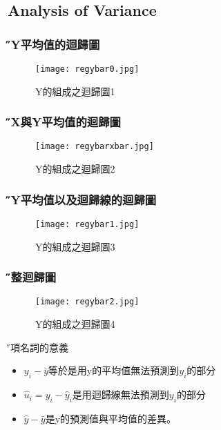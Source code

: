\documentclass[xcolor=dvipsnames]{beamer}
\begin{document}
\subsection{Analysis of Variance}
\begin{frame}\frametitle{\H 有Y平均值的迴歸圖}
\begin{figure}
\begin{center}
\texttt{[image: regybar0.jpg]}
\end{center}
\caption{Y的組成之迴歸圖1}
\end{figure}
\end{frame}
\begin{frame}\frametitle{\H 有X與Y平均值的迴歸圖}
\begin{figure}
\begin{center}
\texttt{[image: regybarxbar.jpg]}
\end{center}
\caption{Y的組成之迴歸圖2}
\end{figure}
\end{frame}
\begin{frame}\frametitle{\H 有Y平均值以及迴歸線的迴歸圖}
\begin{figure}
\begin{center}
\texttt{[image: regybar1.jpg]}
\end{center}
\caption{Y的組成之迴歸圖3}
\end{figure}
\end{frame}
\begin{frame}\frametitle{\H 完整迴歸圖}
\begin{figure}
\begin{center}
\texttt{[image: regybar2.jpg]}
\end{center}
\caption{Y的組成之迴歸圖4}
\end{figure}
\end{frame}
\begin{frame}{\H 各項名詞的意義}
\begin{itemize}
\item $y_{i}-\bar{y}$等於是用y的平均值無法預測到$y_{i}$的部分
\item $\hat{u}_{i}=y_{i}-\hat{y}_{i}$是用迴歸線無法預測到$y_{i}$的部分
\item $\hat{y}-\bar{y}$是y的預測值與平均值的差異。
\end{itemize}
\end{frame}
\end{document}
